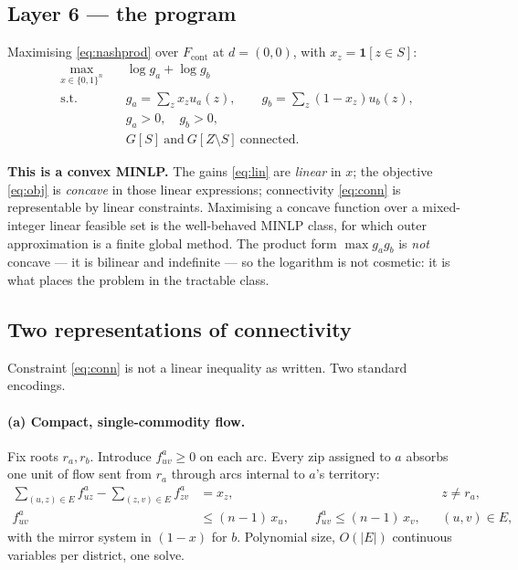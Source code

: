 \documentclass[11pt]{article}
\theoremstyle{remark}\newtheorem*{remark}{Remark}
\begin{document}
\subsection{Layer 6 --- the program}
Maximising \eqref{eq:nashprod} over $F_{\text{cont}}$ at $d=(0,0)$, with
$x_z=\mathbf{1}[z\in S]$:
\begin{align}
\max_{x\in\{0,1\}^n}\quad & \log g_a+\log g_b \label{eq:obj}\\
\text{s.t.}\quad
& g_a=\sum_z x_z u_a(z), \qquad g_b=\sum_z (1-x_z)u_b(z), \label{eq:lin}\\
& g_a>0,\quad g_b>0, \label{eq:feas}\\
& G[S]\ \text{and}\ G[Z\setminus S]\ \text{connected}. \label{eq:conn}
\end{align}

\begin{resultbox}
\textbf{This is a convex MINLP.} The gains \eqref{eq:lin} are \emph{linear} in $x$; the
objective \eqref{eq:obj} is \emph{concave} in those linear expressions; connectivity
\eqref{eq:conn} is representable by linear constraints. Maximising a concave function
over a mixed-integer linear feasible set is the well-behaved MINLP class, for which
outer approximation is a finite global method. The product form
$\max g_ag_b$ is \emph{not} concave --- it is bilinear and indefinite --- so the
logarithm is not cosmetic: it is what places the problem in the tractable class.
\end{resultbox}

\subsection{Two representations of connectivity}
Constraint \eqref{eq:conn} is not a linear inequality as written. Two standard encodings.

\paragraph{(a) Compact, single-commodity flow.} Fix roots $r_a,r_b$. Introduce
$f^a_{uv}\ge0$ on each arc. Every zip assigned to $a$ absorbs one unit of flow sent from
$r_a$ through arcs internal to $a$'s territory:
\begin{align}
\sum_{(u,z)\in E} f^a_{uz}-\sum_{(z,v)\in E} f^a_{zv} &= x_z, && z\ne r_a,\\
f^a_{uv} &\le (n-1)\,x_u, \qquad f^a_{uv}\le (n-1)\,x_v, && (u,v)\in E,
\end{align}
with the mirror system in $(1-x)$ for $b$. Polynomial size, $O(|E|)$ continuous
variables per district, one solve.
\end{document}
